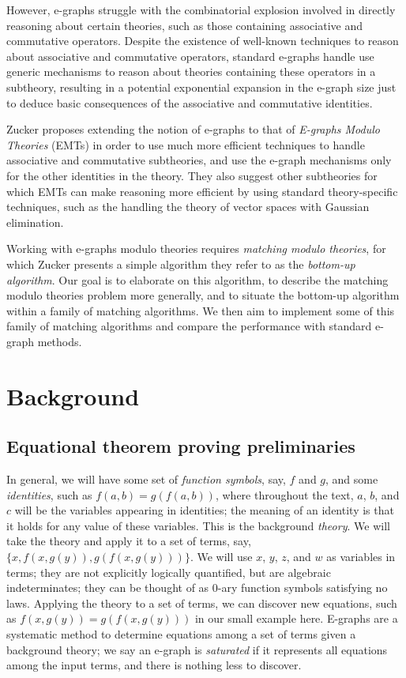 \documentclass{article}
\begin{document}
However, e-graphs struggle with the combinatorial explosion involved in directly reasoning about certain theories, such as those containing associative and commutative operators. Despite the existence of well-known techniques to reason about associative and commutative operators, standard e-graphs handle use generic mechanisms to reason about theories containing these operators in a subtheory, resulting in a potential exponential expansion in the e-graph size just to deduce basic consequences of the associative and commutative identities.

Zucker \cite{zucker2025omelets} proposes extending the notion of e-graphs to that of \textit{E-graphs Modulo Theories} (EMTs) in order to use much more efficient techniques to handle associative and commutative subtheories, and use the e-graph mechanisms only for the other identities in the theory. They also suggest other subtheories for which EMTs can make reasoning more efficient by using standard theory-specific techniques, such as the handling the theory of vector spaces with Gaussian elimination.

Working with e-graphs modulo theories requires \textit{matching modulo theories}, for which Zucker presents a simple algorithm they refer to as the \textit{bottom-up algorithm}. Our goal is to elaborate on this algorithm, to describe the matching modulo theories problem more generally, and to situate the bottom-up algorithm within a family of matching algorithms. We then aim to implement some of this family of matching algorithms and compare the performance with standard e-graph methods.

\section{Background}

\subsection{Equational theorem proving preliminaries}
In general, we will have some set of \emph{function symbols}, say, $f$ and $g$, and some \emph{identities}, such as $f(a, b) = g(f(a, b))$, where throughout the text, $a$, $b$, and $c$ will be the variables appearing in identities; the meaning of an identity is that it holds for any value of these variables. This is the background \emph{theory}. We will take the theory and apply it to a set of terms, say, $\{x, f(x, g(y)), g(f(x, g(y)))\}$. We will use $x$, $y$, $z$, and $w$ as variables in terms; they are not explicitly logically quantified, but are algebraic indeterminates; they can be thought of as 0-ary function symbols satisfying no laws. Applying the theory to a set of terms, we can discover new equations, such as $f(x, g(y)) = g(f(x, g(y)))$ in our small example here. E-graphs are a systematic method to determine equations among a set of terms given a background theory; we say an e-graph is \emph{saturated} if it represents all equations among the input terms, and there is nothing less to discover.
\end{document}
